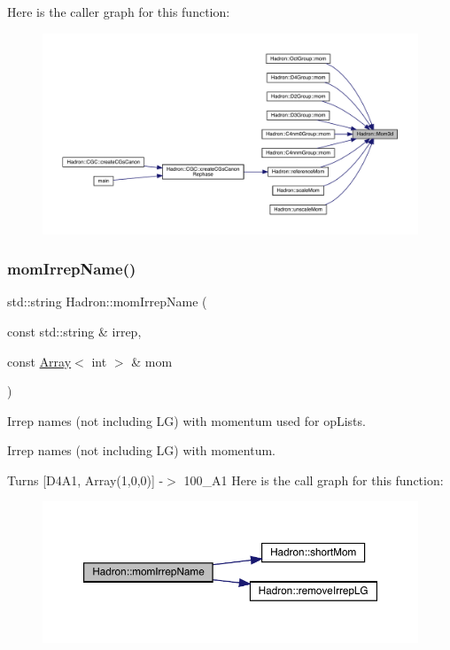 Here is the caller graph for this function\+:
\nopagebreak
\begin{figure}[H]
\begin{center}
\leavevmode
\includegraphics[width=350pt]{d1/daf/namespaceHadron_af72905f43cac8c79d2479565a6fe54d3_icgraph}
\end{center}
\end{figure}
\mbox{\label{namespaceHadron_a5c4cac841f1c5a1f144e6c98360d8a4d}} 
\subsubsection{\texorpdfstring{momIrrepName()}{momIrrepName()}}
{\footnotesize\ttfamily std\+::string Hadron\+::mom\+Irrep\+Name (\begin{DoxyParamCaption}\item[{const std\+::string \&}]{irrep,  }\item[{const \mbox{\hyperlink{classXMLArray_1_1Array}{Array}}$<$ int $>$ \&}]{mom }\end{DoxyParamCaption})}



Irrep names (not including LG) with momentum used for op\+Lists. 

Irrep names (not including LG) with momentum.

Turns \mbox{[}D4\+A1, Array(1,0,0)\mbox{]} -\/$>$ 100\+\_\+\+A1 Here is the call graph for this function\+:
\nopagebreak
\begin{figure}[H]
\begin{center}
\leavevmode
\includegraphics[width=350pt]{d1/daf/namespaceHadron_a5c4cac841f1c5a1f144e6c98360d8a4d_cgraph}
\end{center}
\end{figure}
\mbox{\label{namespaceHadron_ad1ac646aa2d410cc55e4b11c925867a6}} 
